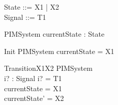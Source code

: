 
\begin{zed}
  State ::= X1 | X2 \\
  Signal ::= T1 
\end{zed}

\begin{schema}{PIMSystem}
  currentState : State
\end{schema}

\begin{schema}{Init}
  PIMSystem
\where
  currentState = X1
\end{schema}

\begin{schema}{TransitionX1X2}
  \Delta PIMSystem\\
  i? : Signal
\where
  i? = T1 \\
  currentState = X1 \\
  currentState' = X2
\end{schema}

